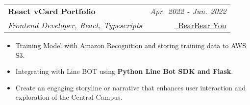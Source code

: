 \documentclass[a4paper,11pt]{article}
\makeatletter
\newcommand{\resumeSubheading}[4]{
\vspace{0.5mm}\item
    \begin{tabular*}{0.98\textwidth}[t]{l@{\extracolsep{\fill}}r}
        \textbf{#1} & \textit{\footnotesize{#4}} \\
        \textit{\footnotesize{#3}} &  \footnotesize{#2}\\
    \end{tabular*}
    \vspace{-2.4mm}
}
\newcommand{\resumeItemListStart}{\begin{justify}\begin{itemize}[
    leftmargin=3ex, 
    rightmargin=2ex, 
    noitemsep,
    labelsep=1.2mm,
    itemsep=0.5mm
    ]\small
}
\newcommand{\resumeItemListEnd}{\end{itemize}\end{justify}\vspace{-2mm}}
\makeatother
\begin{document}
            

    
    
    
            
            
        \resumeSubheading
            { React vCard Portfolio} 
            {
            \href{https://github.com/1chooo/bear-bear}{\faGithub\ BearBear You} 
            } %
            {Frontend Developer, React, Typescripts}%
            {Apr. 2022 - Jun. 2022} %
            
            \vspace{-1.0mm}
            
            \resumeItemListStart
                \item {Training Model with Amazon Recognition and storing training data to AWS S3.}
                \item {Integrating with Line BOT using \textbf{Python Line Bot SDK and Flask}.}
                \item {Create an engaging storyline or narrative that enhances user interaction and exploration of the Central Campus.}
            \resumeItemListEnd
\end{document}

